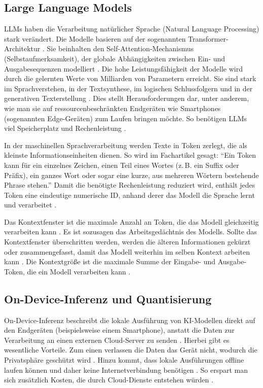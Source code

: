 \subsection{Large Language Models}
\label{subsec:llm}
\acp{LLM} haben die Verarbeitung natürlicher Sprache (Natural Language Processing) stark verändert. Die Modelle basieren auf der sogenannten Transformer-Architektur \autocite{edgellm_review}. Sie beinhalten den Self-Attention-Mechanismus (Selbstaufmerksamkeit), der globale Abhängigkeiten zwischen Ein- und Ausgabesequenzen modelliert \autocite{vaswani2017attention}.
Die hohe Leistungsfähigkeit der Modelle wird durch die gelernten Werte von
Milliarden von Parametern erreicht. Sie sind stark im Sprachverstehen, in der Textsynthese, im logischen
Schlussfolgern und in der generativen Texterstellung \autocite{edgellm_review}.
Dies stellt Herausforderungen dar, unter anderem, wie man
sie auf ressourcenbeschränkten Endgeräten wie Smartphones (sogenannten
Edge-Geräten) zum Laufen bringen möchte. So benötigen \acp{LLM} viel
Speicherplatz und Rechenleistung \autocite{edgellm_review}.
\vspace{\baselineskip}

\noindent In der maschinellen Sprachverarbeitung werden Texte in Token zerlegt, die als kleinste Informationseinheiten dienen. So wird im Fachartikel \autocite{ibm_contextwindow} gesagt: \enquote{Ein Token kann für ein einzelnes Zeichen, einen Teil eines Wortes (z.\,B. ein Suffix oder Präfix), ein ganzes Wort oder sogar eine kurze, aus mehreren Wörtern bestehende Phrase stehen.} Damit die benötigte Rechenleistung reduziert wird, enthält jedes Token eine eindeutige numerische \ac{ID}, anhand derer das Modell die Sprache lernt und verarbeitet \autocite{ibm_contextwindow}.
\vspace{\baselineskip}

\noindent Das Kontextfenster ist die maximale Anzahl an Token, die das Modell gleichzeitig verarbeiten kann \autocite{ibm_contextwindow}. Es ist sozusagen das Arbeitsgedächtnis des Modells. Sollte das Kontextfenster überschritten werden, werden die älteren Informationen gekürzt oder zusammengefasst, damit das Modell weiterhin im selben Kontext arbeiten kann \autocite{ibm_contextwindow}. Die Kontextgröße ist die maximale Summe der Eingabe- und Ausgabe-Token, die ein Modell verarbeiten kann \autocite{mediapipe_llm}.
\subsection{On-Device-Inferenz und Quantisierung}
\label{subsec:ondevice}
On-Device-Inferenz beschreibt die lokale Ausführung von KI-Modellen direkt auf den Endgeräten
(beispielsweise einem Smartphone), anstatt die Daten zur Verarbeitung an einen externen
Cloud-Server zu senden \autocite{edgellm_review}. Hierbei gibt es wesentliche Vorteile. Zum einen verlassen die Daten das Gerät nicht, wodurch die Privatsphäre geschützt wird \autocite{edgellm_review}. Hinzu kommt, dass lokale Ausführungen offline laufen können und daher keine Internetverbindung benötigen \autocite{edgellm_review}. So erspart man sich zusätzlich Kosten, die durch Cloud-Dienste entstehen würden \autocite{edgellm_review}.
\vspace{\baselineskip}

